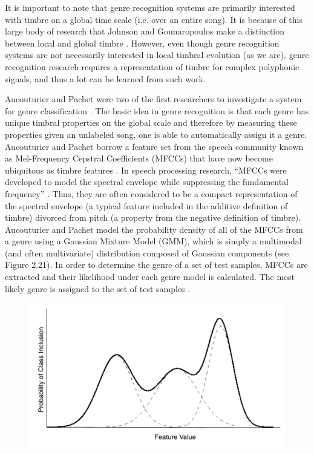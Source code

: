 \documentclass[a4paper,12pt]{report} 	%
\numberwithin{figure}{chapter}
\numberwithin{table}{chapter}
\numberwithin{equation}{chapter}
\begin{document}
\begin{flushleft}
It is important to note that genre recognition systems are primarily interested with timbre on a global time scale (i.e. over an entire song). It is because of this large body of research that Johnson and Gounaropoulos make a distinction between local and global timbre \cite{Johnson:2006pi}. However, even though genre recognition systems are not necessarily interested in local timbral evolution (as we are), genre recognition research requires a representation of timbre for complex polyphonic signals, and thus a lot can be learned from such work.

Aucouturier and Pachet were two of the first researchers to investigate a system for genre classification \cite{Aucouturier:2002gf}. The basic idea in genre recognition is that each genre has unique timbral properties on the global scale and therefore by measuring these properties given an unlabeled song, one is able to automatically assign it a genre. Aucouturier and Pachet borrow a feature set from the speech community known as Mel-Frequency Cepstral Coefficients (MFCCs) that have now become ubiquitous as timbre features \cite[p. 1]{Aucouturier:2002gf}. In speech processing research, ``MFCCs were developed to model the spectral envelope while suppressing the fundamental frequency'' \cite[p. 1]{Jensen:2006dw}. Thus, they are often considered to be a compact representation of the spectral envelope (a typical feature included in the additive definition of timbre) divorced from pitch (a property from the negative definition of timbre). Aucouturier and Pachet model the probability density of all of the MFCCs from a genre using a Gaussian Mixture Model (GMM), which is simply a multimodal (and often multivariate) distribution composed of Gaussian components (see Figure 2.21). In order to determine the genre of a set of test samples, MFCCs are extracted and their likelihood under each genre model is calculated. The most likely genre is assigned to the set of test samples \cite[p. 2]{Aucouturier:2002gf}.
\\
\begin{figure}[h!]
\begin{center}
\includegraphics[scale=0.70]{GMM}

\end{center}
\end{figure}
\end{flushleft}
\end{document}
